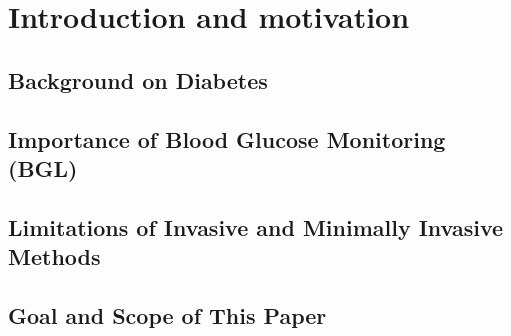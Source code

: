 
\chapter{Introduction and motivation}
\label{cha:Einleitung und Motivation}

\section{Background on Diabetes}
\label{sec:Background on Diabetes}

\section{Importance of Blood Glucose Monitoring (BGL)}
\label{sec:Importance of Blood Glucose Monitoring (BGL)}

\section{Limitations of Invasive and Minimally Invasive Methods}
\label{sec:Limitations of Invasive and Minimally Invasive Methods}

\section{Goal and Scope of This Paper}
\label{sec:Goal and Scope of This Paper}
